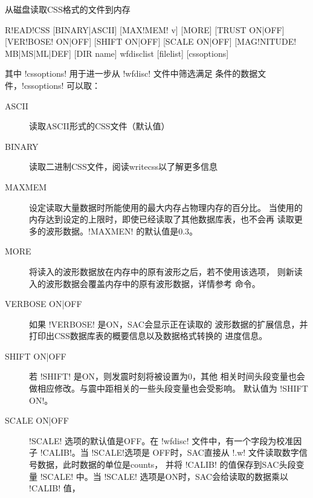 \label{cmd:readcss}

从磁盘读取CSS格式的文件到内存

\begin{SACSTX}
R!EAD!CSS [BINARY|ASCII] [MAX!MEM! v] [MORE] [TRUST ON|OFF] [VER!BOSE! ON|OFF]
    [SHIFT ON|OFF] [SCALE ON|OFF] [MAG!NITUDE! MB|MS|ML|DEF] [DIR name] wfdisclist
    [filelist] [cssoptions]
\end{SACSTX}
其中 !cssoptions! 用于进一步从 !wfdisc! 文件中筛选满足
条件的数据文件，!cssoptions! 可以取：
\begin{SACSTX}
\end{SACSTX}

\begin{description}
\item [ASCII] 读取ASCII形式的CSS文件（默认值）
\item [BINARY] 读取二进制CSS文件，阅读writecss以了解更多信息
\item [MAXMEM] 设定读取大量数据时所能使用的最大内存占物理内存的百分比。
    当使用的内存达到设定的上限时，即使已经读取了其他数据库表，也不会再
    读取更多的波形数据。!MAXMEN! 的默认值是0.3。
\item [MORE] 将读入的波形数据放在内存中的原有波形之后，若不使用该选项，
    则新读入的波形数据会覆盖内存中的原有波形数据，详情参考 
    命令。
\item [VERBOSE ON|OFF] 如果 !VERBOSE! 是ON，SAC会显示正在读取的
    波形数据的扩展信息，并打印出CSS数据库表的概要信息以及数据格式转换的
    进度信息。
\item [SHIFT ON|OFF] 若 !SHIFT! 是ON，则发震时刻将被设置为0，其他
    相关时间头段变量也会做相应修改。与震中距相关的一些头段变量也会受影响。
    默认值为 !SHIFT ON!。
\item [SCALE ON|OFF] !SCALE! 选项的默认值是OFF。在 !wfdisc!
    文件中，有一个字段为校准因子 !CALIB!。当 !SCALE!选项是
    OFF时，SAC直接从 !.w! 文件读取数字信号数据，此时数据的单位是counts，
    并将 !CALIB! 的值保存到SAC头段变量 !SCALE! 中。当
    !SCALE! 选项是ON时，SAC会给读取的数据乘以 !CALIB! 值，

\end{description}
